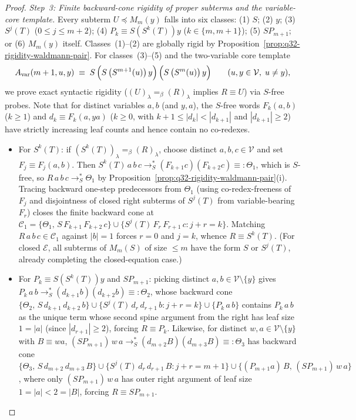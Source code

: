 \documentclass[11pt,reqno]{amsart}
\numberwithin{equation}{section}
\theoremstyle{plain}
\theoremstyle{definition}
\theoremstyle{remark}
\newcommand{\redSs}{\to_S^*}
\begin{document}
\begin{proof}
\emph{Step~3: Finite backward-cone rigidity of proper subterms and the variable-core template.} Every subterm $U \preceq M_m(y)$ falls into six classes: (1) $S$; (2) $y$; (3) $S^j(T)$ ($0 \le j \le m + 2$); (4) $P_k \equiv S(S^k(T))y$ ($k \in \{m, m + 1\}$); (5) $S P_{m+1}$; or (6) $M_m(y)$ itself. Classes~(1)--(2) are globally rigid by Proposition~\ref{prop:q32-rigidity-waldmann-pair}. For classes~(3)--(5) and the two-variable core template
\[
  A_{\mathrm{var}}(m + 1, u, y) \;\equiv\; S\,\Bigl(S\,\bigl(S^{m+1}(u)\bigr)\,y\Bigr)\,\Bigl(S\,\bigl(S^m(u)\bigr)\,y\Bigr) \qquad (u, y \in \mathcal{V},\; u \ne y),
\]
we prove exact syntactic rigidity ($(U)_\lambda =_\beta (R)_\lambda$ implies $R \equiv U$) via $S$-free probes. Note that for distinct variables $a, b$ (and $y, a$), the $S$-free words $F_k(a, b)$ ($k \ge 1$) and $d_k \equiv F_k(a, y a)$ ($k \ge 0$, with $k + 1 \le |d_k| < |d_{k+1}|$ and $|d_{k+1}| \ge 2$) have strictly increasing leaf counts and hence contain no co-redexes.
\begin{itemize}[leftmargin=1.8em]
  \item For $S^k(T)$: if $(S^k(T))_\lambda =_\beta (R)_\lambda$, choose distinct $a, b, c \in \mathcal{V}$ and set $F_j \equiv F_j(a, b)$. Then $S^k(T)\,a\,b\,c \redSs (F_{k+1} c)(F_{k+2} c) \equiv: \Theta_1$, which is $S$-free, so $R\,a\,b\,c \redSs \Theta_1$ by Proposition~\ref{prop:q32-rigidity-waldmann-pair}(i). Tracing backward one-step predecessors from $\Theta_1$ (using co-redex-freeness of $F_j$ and disjointness of closed right subterms of $S^j(T)$ from variable-bearing $F_r$) closes the finite backward cone at $\mathcal{C}_1 = \{\Theta_1,\, S\,F_{k+1}\,F_{k+2}\,c\} \cup \{S^j(T)\,F_r\,F_{r+1}\,c : j + r = k\}$. Matching $R\,a\,b\,c \in \mathcal{C}_1$ against $|b| = 1$ forces $r = 0$ and $j = k$, whence $R \equiv S^k(T)$. (For closed $\mathcal{E}$, all subterms of $M_m(S)$ of size $\le m$ have the form $S$ or $S^j(T)$, already completing the closed-equation case.)
  \item For $P_k \equiv S(S^k(T))y$ and $S P_{m+1}$: picking distinct $a, b \in \mathcal{V} \setminus \{y\}$ gives $P_k\,a\,b \redSs (d_{k+1} b)(d_{k+2} b) \equiv: \Theta_2$, whose backward cone $\{\Theta_2,\, S\,d_{k+1}\,d_{k+2}\,b\} \cup \{S^j(T)\,d_r\,d_{r+1}\,b : j + r = k\} \cup \{P_k\,a\,b\}$ contains $P_k\,a\,b$ as the unique term whose second spine argument from the right has leaf size $1 = |a|$ (since $|d_{r+1}| \ge 2$), forcing $R \equiv P_k$. Likewise, for distinct $w, a \in \mathcal{V} \setminus \{y\}$ with $B \equiv w a$, $(S P_{m+1})\,w\,a \redSs (d_{m+2} B)(d_{m+3} B) \equiv: \Theta_3$ has backward cone $\{\Theta_3,\, S\,d_{m+2}\,d_{m+3}\,B\} \cup \{S^j(T)\,d_r\,d_{r+1}\,B : j + r = m + 1\} \cup \{(P_{m+1} a)\,B,\, (S P_{m+1})\,w\,a\}$, where only $(S P_{m+1})\,w\,a$ has outer right argument of leaf size $1 = |a| < 2 = |B|$, forcing $R \equiv S P_{m+1}$.

\end{itemize}
\end{proof}
\end{document}
